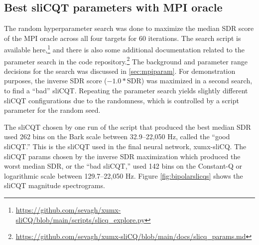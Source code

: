 \documentclass[report.tex]{subfiles}
\begin{document}
\newpagefill

\subsection{Best sliCQT parameters with MPI oracle}

The random hyperparameter search was done to maximize the median SDR score of the MPI oracle across all four targets for 60 iterations. The search script is available here,\footnote{\url{https://github.com/sevagh/xumx-sliCQ/blob/main/scripts/slicq_explore.py}} and there is also some additional documentation related to the parameter search in the code repository.\footnote{\url{https://github.com/sevagh/xumx-sliCQ/blob/main/docs/slicq_params.md}} The background and parameter range decisions for the search was discussed in \ref{sec:mpiparam}. For demonstration purposes, the inverse SDR score ($-1.0*\text{SDR}$) was maximized in a second search, to find a ``bad'' sliCQT. Repeating the parameter search yields slightly different sliCQT configurations due to the randomness, which is controlled by a script parameter for the random seed.

The sliCQT chosen by one run of the script that produced the best median SDR used 262 bins on the Bark scale between 32.9--22,050 Hz, called the ``good sliCQT.'' This is the sliCQT used in the final neural network, xumx-sliCQ. The sliCQT params chosen by the inverse SDR maximization which produced the worst median SDR, or the ``bad sliCQT,'' used 142 bins on the Constant-Q or logarithmic scale between 129.7--22,050 Hz. Figure \ref{fig:bipolarslicqs} shows the sliCQT magnitude spectrograms.
\end{document}
